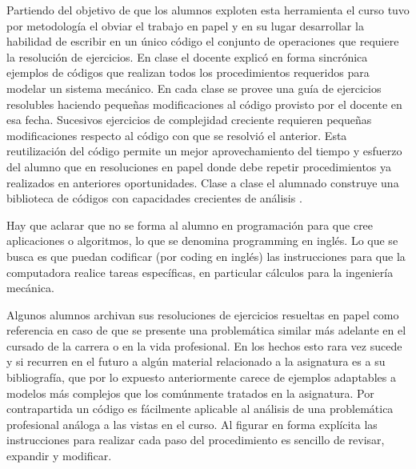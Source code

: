 Partiendo del objetivo de que los alumnos exploten esta herramienta el curso tuvo por metodología el obviar el trabajo en papel y en su lugar desarrollar la habilidad de escribir en un único código el conjunto de operaciones que requiere la resolución de ejercicios. En clase el docente explicó en forma sincrónica ejemplos de códigos que realizan todos los procedimientos requeridos para modelar un sistema mecánico. En cada clase se provee una guía de ejercicios resolubles haciendo pequeñas modificaciones al código provisto por el docente en esa fecha. Sucesivos ejercicios de complejidad creciente requieren pequeñas modificaciones respecto al código con que se resolvió el anterior. Esta reutilización del código permite un mejor aprovechamiento del tiempo y esfuerzo del alumno que en resoluciones en papel donde debe repetir procedimientos ya realizados en anteriores oportunidades. Clase a clase el alumnado construye una biblioteca de códigos con capacidades crecientes de análisis \cite{Barba2019}.

Hay que aclarar que no se forma al alumno en programación para que cree aplicaciones o algoritmos, lo que se denomina programming en inglés. Lo que se busca es que puedan codificar  (por coding en inglés) las instrucciones para que la computadora realice tareas específicas, en particular cálculos para la ingeniería mecánica.

Algunos alumnos archivan sus resoluciones de ejercicios resueltas en papel como referencia en caso de que se presente una problemática similar más adelante en el cursado de la carrera o en la vida profesional. En los hechos esto rara vez sucede y si recurren en el futuro a algún material relacionado a la asignatura es a su bibliografía, que por lo expuesto anteriormente carece de ejemplos adaptables a modelos más complejos que los comúnmente tratados en la asignatura. Por contrapartida un código es fácilmente aplicable al análisis de una problemática profesional análoga a las vistas en el curso. Al figurar en forma explícita las instrucciones para realizar cada paso del procedimiento es sencillo de revisar, expandir y modificar.